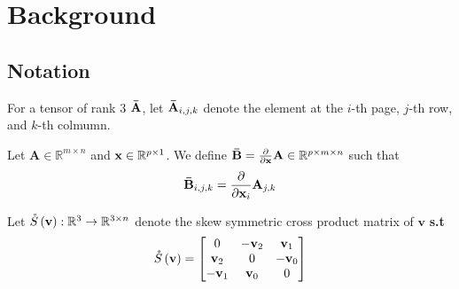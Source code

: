 \chapter{Background}
\section{Notation}

\begin{definition} \label{tensor_indexing}
\noindent For a tensor of rank 3 $\tensor{A}$, let $\tensor{A}_{i,j,k}$ denote the element at the $i$-th page, $j$-th row, and $k$-th colmumn.

\begin{figure}[H]
    \centering
\end{figure}
\end{definition}

\begin{definition} \label{matrix_derivative}
Let $\mathbf{A} \in \mathbb{R}^{m \times n}$ and $\mathbf{\x} \in \mathbb{R}^{p \times 1}$. We define $\tensor{B} = \frac{\partial}{\partial \x}\mathbf{A} \in \mathbb{R}^{p \times m \times n }$ such that
\begin{align*}
    \tensor{B}_{i, j, k} = \frac{\partial}{\partial \x_i}\mathbf{A}_{j, k}
\end{align*}
\end{definition}

\begin{definition}
Let $\S{\mathbf{v}} : \mathbb{R}^{3} \rightarrow \mathbb{R}^{3 \times n}$  denote the skew symmetric cross product matrix of $\mathbf{v}$ \textbf{s.t}
\begin{align*}
    \S{\mathbf{v}} = \begin{bmatrix}
    0 & -\mathbf{v}_2 & \mathbf{v}_1 \\
    \mathbf{v}_2 & 0 & -\mathbf{v}_0 \\
    -\mathbf{v}_1 & \mathbf{v}_0 & 0
    \end{bmatrix}
\end{align*}
\end{definition}


